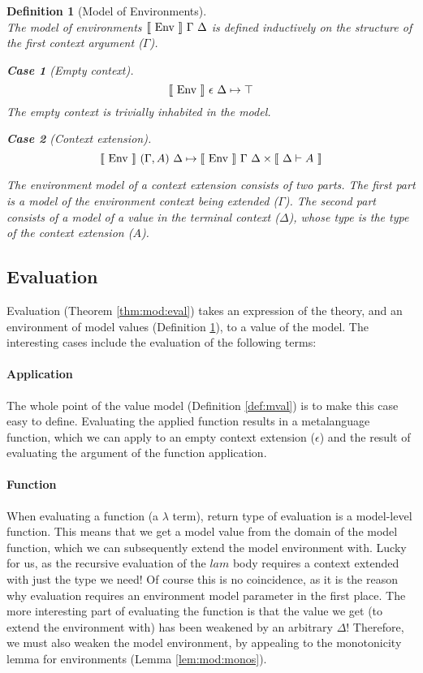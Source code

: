 \documentclass[preprint,nonatbib]{sigplanconf}
\newtheorem{defin}{Definition}
\newtheorem{subdefin}{Case}
\numberwithin{subdefin}{defin}
\theoremstyle{definition}
\numberwithin{subtheorem}{theorem}
\numberwithin{sublemma}{theorem}
\numberwithin{corollary}{theorem}
\numberwithin{case}{theorem}
\numberwithin{slcase}{sublemma}
\numberwithin{scase}{subtheorem}
\numberwithin{lcase}{lemma}
\newcommand{\refdef}[1]{Definition \ref{def:#1}}
\newcommand{\refthm}[1]{Theorem \ref{thm:#1}}
\newcommand{\reflem}[1]{Lemma \ref{lem:#1}}
\def\cross{\times}
\def\dfn{\mapsto}
\def\lam{\lambda}
\def\emp{\epsilon}
\newcommand{\el}[1]{\llbracket ~ #1 ~ \rrbracket}
\newcommand{\fun}[1]{\textmd{#1}}
\newcommand{\dtypm}[1]{\el{\Delta \vdash #1}}
\def\menv{\el{\fun{Env}}~\Gamma~\Delta}
\newcommand{\dmenv}[1]{\el{\fun{Env}}~#1~\Delta}
\begin{document}
\begin{defin}[Model of Environments]
\label{def:menv}
$ $\\
The model of environments $\menv$ is defined inductively on the structure
of the first context argument ($\Gamma$).

\begin{subdefin}[Empty context]
$$
\dmenv{\emp} \dfn \top
$$
The empty context is trivially inhabited in the model.
\end{subdefin}

\begin{subdefin}[Context extension]
$$
\dmenv{(\Gamma, A)} \dfn \dmenv{\Gamma} \cross \dtypm{A}
$$

The environment model of a context extension consists of two parts. The first part
is a model of the environment context being extended ($\Gamma$). The second part
consists of a model of a value in the terminal context ($\Delta$),
whose type is the type of the context extension ($A$).

\end{subdefin}

\end{defin}

\subsection{Evaluation}

Evaluation (\refthm{mod:eval}) takes an expression of the theory, and an
environment of model values (\refdef{menv}), to a value of the model.
The interesting cases include the evaluation of the following terms:

\paragraph{Application} The whole point of the value model
(\refdef{mval}) is to make this case easy to define. Evaluating the
applied function results in a metalanguage function, which we can
apply to an empty context extension ($\emp$) and the result of
evaluating the argument of the function application.

\paragraph{Function} When evaluating a function (a $\lam$ term),
return type of evaluation is a model-level function. This means that
we get a model value from the domain of the model function, which we
can subsequently extend the model environment with. Lucky for us, as
the recursive evaluation of the $lam$ body requires a context extended
with just the type we need! Of course this is no coincidence, as it is
the reason why evaluation requires an environment model parameter in
the first place. The more interesting part of evaluating the function
is that the value we get (to extend the environment with) has been
weakened by an arbitrary $\Delta$! Therefore, we must also weaken the
model environment, by appealing to the monotonicity lemma for
environments (\reflem{mod:monos}).
\end{document}
